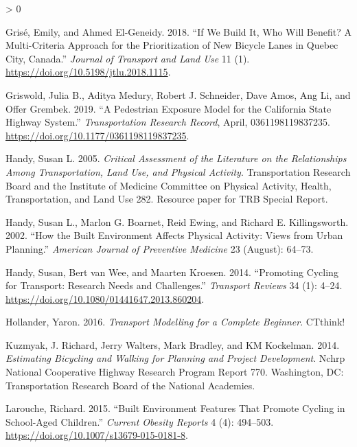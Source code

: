 \documentclass[galley]{jtlu-article-2col}
\newlength{\cslhangindent}
\newenvironment{CSLReferences}[2] %
 {%
  \setlength{\parindent}{0pt}
  \ifodd #1 \everypar{\setlength{\hangindent}{\cslhangindent}}\ignorespaces\fi
  \ifnum #2 > 0
  \setlength{\parskip}{#2\baselineskip}
  \fi
 }%
 {}
\begin{document}
\begin{CSLReferences}{1}{0}
\leavevmode\hypertarget{ref-grise_if_2018}{}%
Grisé, Emily, and Ahmed El-Geneidy. 2018. {``If We Build It, Who Will Benefit? {A} Multi-Criteria Approach for the Prioritization of New Bicycle Lanes in {Quebec City}, {Canada}.''} \emph{Journal of Transport and Land Use} 11 (1). \url{https://doi.org/10.5198/jtlu.2018.1115}.

\leavevmode\hypertarget{ref-griswold_pedestrian_2019}{}%
Griswold, Julia B., Aditya Medury, Robert J. Schneider, Dave Amos, Ang Li, and Offer Grembek. 2019. {``A Pedestrian Exposure Model for the California State Highway System.''} \emph{Transportation Research Record}, April, 0361198119837235. \url{https://doi.org/10.1177/0361198119837235}.

\leavevmode\hypertarget{ref-handy_critical_2005}{}%
Handy, Susan L. 2005. \emph{Critical Assessment of the Literature on the Relationships Among Transportation, Land Use, and Physical Activity}. Transportation Research Board and the Institute of Medicine Committee on Physical Activity, Health, Transportation, and Land Use 282. {Resource paper for TRB Special Report}.

\leavevmode\hypertarget{ref-handy_how_2002}{}%
Handy, Susan L., Marlon G. Boarnet, Reid Ewing, and Richard E. Killingsworth. 2002. {``How the Built Environment Affects Physical Activity: Views from Urban Planning.''} \emph{American Journal of Preventive Medicine} 23 (August): 64--73.

\leavevmode\hypertarget{ref-handy_promoting_2014}{}%
Handy, Susan, Bert van Wee, and Maarten Kroesen. 2014. {``Promoting {Cycling} for {Transport}: {Research Needs} and {Challenges}.''} \emph{Transport Reviews} 34 (1): 4--24. \url{https://doi.org/10.1080/01441647.2013.860204}.

\leavevmode\hypertarget{ref-hollander_transport_2016}{}%
Hollander, Yaron. 2016. \emph{Transport {Modelling} for a {Complete Beginner}}. {CTthink!}

\leavevmode\hypertarget{ref-kuzmyak_estimating_2014}{}%
Kuzmyak, J. Richard, Jerry Walters, Mark Bradley, and KM Kockelman. 2014. \emph{Estimating Bicycling and Walking for Planning and Project Development}. Nchrp National Cooperative Highway Research Program Report 770. {Washington, DC}: {Transportation Research Board of the National Academies}.

\leavevmode\hypertarget{ref-larouche_built_2015}{}%
Larouche, Richard. 2015. {``Built {Environment Features} That {Promote Cycling} in {School}-{Aged Children}.''} \emph{Current Obesity Reports} 4 (4): 494--503. \url{https://doi.org/10.1007/s13679-015-0181-8}.


\end{CSLReferences}
\end{document}
